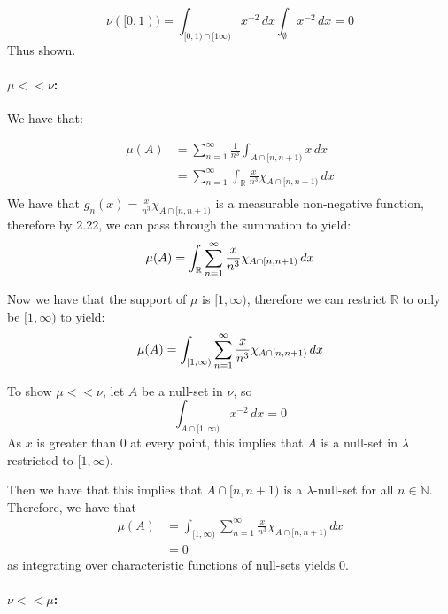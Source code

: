 \documentclass{article}
\theoremstyle{definition}
\numberwithin{theorem}{section}
\numberwithin{equation}{section}
\begin{document}
\begin{equation}
	\nu([0, 1)) = \int_{[0, 1) \cap [1 \infty)} x^{-2} \, dx\int_{\emptyset} x^{-2} \, dx = 0
\end{equation}
Thus shown.

\paragraph{$\mu << \nu$:}
We have that:

\begin{align*}
	\mu(A) &= \sum_{n = 1}^{\infty} \frac{1}{n^3} \int_{A\cap [n, n + 1)} x \, dx \\
	&=\sum_{n = 1}^{\infty} \int_{\mathbb{R}} \frac{x}{n^3} \chi_{A\cap [n, n + 1)} \, dx \\
\end{align*}
We have that $g_n(x) = \frac{x}{n^3} \chi_{A\cap [n, n + 1)}$ is a measurable non-negative function, therefore by 2.22, we can pass through the summation to yield:
\begin{equation}
		\mu(A) = \int_{\mathbb{R}}\sum_{n = 1}^{\infty} \frac{x}{n^3} \chi_{A\cap [n, n + 1)} \, dx \\
\end{equation}

Now we have that the support of $\mu$ is $[1, \infty)$, therefore we can restrict $\mathbb{R}$ to only be $[1, \infty)$ to yield:
\begin{equation}
	\mu(A) = \int_{[1, \infty)}\sum_{n = 1}^{\infty} \frac{x}{n^3} \chi_{A\cap [n, n + 1)} \, dx \\
\end{equation}

To show $\mu << \nu$, let $A$ be a null-set in $\nu$, so
\begin{equation}
	\int_{A \cap [1, \infty)} x^{-2}\, dx = 0
\end{equation}
As $x$ is greater than 0 at every point, this implies that $A$ is a null-set in $\lambda$ restricted to $[1, \infty)$.

Then we have that this implies that $ A \cap [n, n + 1)$ is a $\lambda$-null-set for all $n \in \mathbb{N}$. Therefore, we have that
\begin{align*}
	\mu(A) &= \int_{[1, \infty)}\sum_{n = 1}^{\infty} \frac{x}{n^3} \chi_{A\cap [n, n + 1)} \, dx \\
	&= 0
\end{align*}
as integrating over characteristic functions of null-sets yields 0.


\paragraph{$\nu << \mu$:}
\end{document}
